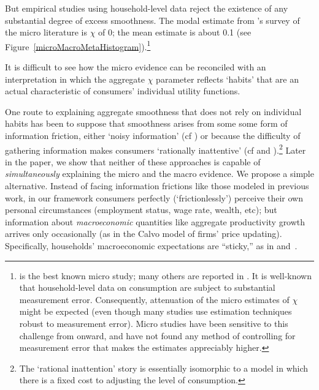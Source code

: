 \documentclass[titlepage]{\econtex}\newcommand{\texname}{cAndCwithStickyE}
\begin{document}
But empirical studies using household-level data reject the existence of any substantial degree of excess smoothness.  The modal estimate from \cite{hrsHabit}'s survey of the micro literature is $\chi$ of 0; the mean estimate is about 0.1 (see Figure~\ref{microMacroMetaHistogram}).\footnote{\cite{dynanHabits} is the best known micro study; many others are reported in \cite{hrsHabit}.  It is well-known that household-level data on consumption are subject to substantial measurement error. Consequently, attenuation of the micro estimates of $\chi$ might be expected (even though many studies use estimation techniques robust to measurement error). Micro studies have been sensitive to this challenge from \cite{dynanHabits} onward, and have not found any method of controlling for measurement error that makes the estimates appreciably higher.  } 

It is difficult to see how the micro evidence can be reconciled with an interpretation in which the aggregate $\chi$ parameter reflects `habits' that are an actual characteristic of consumers' individual utility functions.

One route to explaining aggregate smoothness that does not rely on individual habits has been to suppose that smoothness arises from some some form of information friction, either `noisy information' (cf \cite{pischkeMicroMacro}) or because the difficulty of gathering information makes consumers `rationally inattentive' (cf \cite{reis:inattentive} and \cite{mw09:RI}).\footnote{The `rational inattention' story is essentially isomorphic to a model in which there is a fixed cost to adjusting the level of consumption.}  Later in the paper, we show that neither of these approaches is capable of \textit{simultaneously} explaining the micro and the macro evidence.  We propose a simple alternative.  Instead of facing information frictions like those modeled in previous work, in our framework consumers perfectly (`frictionlessly') perceive their own personal circumstances (employment status, wage rate, wealth, etc); but information about \textit{macroeconomic} quantities like aggregate productivity growth arrives only occasionally (as in the Calvo model of firms' price updating).  Specifically, households' macroeconomic expectations are ``sticky,'' as in \cite{mrSlumps} and~\cite{carroll:epidemicinflQJE}.
\end{document}
